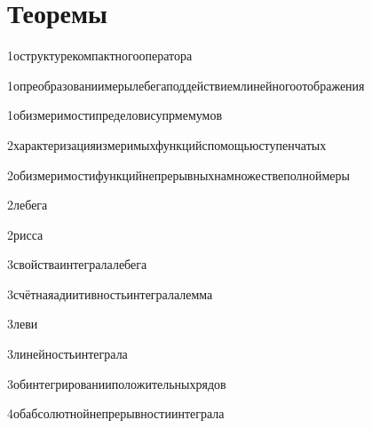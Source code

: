 





\section{Теоремы}

{1}{оструктурекомпактногооператора}

{1}{опреобразованиимерылебегаподдействиемлинейногоотображения}

{1}{обизмеримостипределовисупрмемумов}

{2}{характеризацияизмеримыхфункцийспомощьюступенчатых}

{2}{обизмеримостифункцийнепрерывныхнамножествеполноймеры}

{2}{лебега}

{2}{рисса}

{3}{свойстваинтегралалебега}

{3}{счётнаяадиитивностьинтегралалемма}

{3}{леви}

{3}{линейностьинтеграла}

{3}{обинтегрированииположительныхрядов}

{4}{обабсолютнойнепрерывностиинтеграла}

